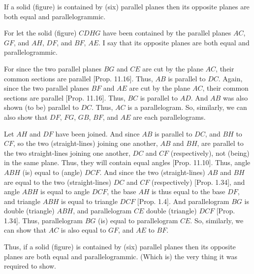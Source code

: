 \begin{Parallel}{}{}
{If a solid (figure) is contained by (six) parallel planes then its opposite planes
are both equal and parallelogrammic.

\epsfysize=1.5in
\centerline{}

For let the solid (figure) $CDHG$ have been contained by the parallel planes
$AC$, $GF$, and $AH$, $DF$, and $BF$, $AE$. I say that its opposite
planes are both equal and parallelogrammic.

For since the two parallel planes $BG$ and $CE$ are cut by the plane
$AC$, their common sections are parallel [Prop. 11.16]. Thus, $AB$ is parallel to $DC$.  Again, since
the two parallel planes $BF$ and $AE$ are cut by the plane
$AC$, their common sections are parallel [Prop. 11.16]. Thus,  $BC$ is parallel to $AD$. And
$AB$ was also shown (to be) parallel to $DC$. Thus, $AC$ is a parallelogram. So, similarly, we can also show that $DF$, $FG$, $GB$,
$BF$, and $AE$ are each parallelograms.

Let $AH$ and $DF$ have been joined. And since $AB$ is parallel to
$DC$, and $BH$ to $CF$, so the two (straight-lines) joining one another,
$AB$ and $BH$,
are parallel to the two straight-lines joining one another, $DC$ and
$CF$ (respectively), not (being) in the same plane. Thus, they
will contain equal angles [Prop. 11.10]. Thus,
angle $ABH$ (is) equal to (angle) $DCF$. And since the two (straight-lines)
$AB$ and $BH$ are equal to the two (straight-lines) $DC$ and $CF$ (respectively) [Prop. 1.34], and angle $ABH$ is equal to angle $DCF$, the base
$AH$ is thus equal to the base $DF$, and triangle $ABH$ is equal to
triangle $DCF$ [Prop. 1.4]. And parallelogram
$BG$ is double (triangle) $ABH$, and parallelogram $CE$
double (triangle) $DCF$ [Prop. 1.34]. Thus,
parallelogram $BG$ (is) equal to parallelogram $CE$. So, similarly,
we can show that $AC$ is also equal to $GF$, and $AE$ to $BF$.

Thus, if a solid (figure) is contained by (six) parallel planes then its opposite planes
are both equal and parallelogrammic. (Which is) the very thing it was required to
show.}
\end{Parallel}

